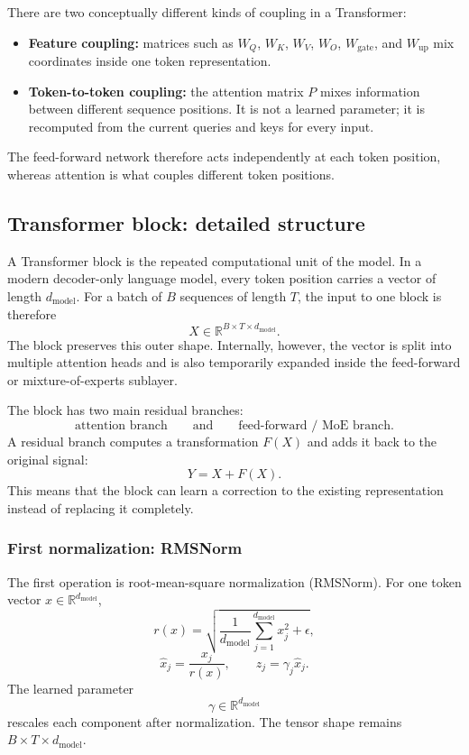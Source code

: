 \documentclass[11pt]{article}
\begin{document}
There are two conceptually different kinds of coupling in a Transformer:
\begin{itemize}[leftmargin=1.5em]
    \item \textbf{Feature coupling:} matrices such as $W_Q$, $W_K$, $W_V$,
    $W_O$, $W_{\mathrm{gate}}$, and $W_{\mathrm{up}}$ mix coordinates inside one
    token representation.
    \item \textbf{Token-to-token coupling:} the attention matrix $P$ mixes
    information between different sequence positions. It is not a learned
    parameter; it is recomputed from the current queries and keys for every input.
\end{itemize}
The feed-forward network therefore acts independently at each token position,
whereas attention is what couples different token positions.

\subsection{Transformer block: detailed structure}

A Transformer block is the repeated computational unit of the model.  In a
modern decoder-only language model, every token position carries a vector of
length $d_{\mathrm{model}}$.  For a batch of $B$ sequences of length $T$, the
input to one block is therefore
\[
X\in\mathbb{R}^{B\times T\times d_{\mathrm{model}}}.
\]
The block preserves this outer shape.  Internally, however, the vector is split
into multiple attention heads and is also temporarily expanded inside the
feed-forward or mixture-of-experts sublayer.

The block has two main residual branches:
\[
\boxed{\text{attention branch}}
\qquad\text{and}\qquad
\boxed{\text{feed-forward / MoE branch}}.
\]
A residual branch computes a transformation $F(X)$ and adds it back to the
original signal:
\[
Y=X+F(X).
\]
This means that the block can learn a correction to the existing representation
instead of replacing it completely.

\subsubsection{First normalization: RMSNorm}
The first operation is root-mean-square normalization (RMSNorm). For one token
vector $x\in\mathbb{R}^{d_{\mathrm{model}}}$,
\[
r(x)=\sqrt{\frac{1}{d_{\mathrm{model}}}\sum_{j=1}^{d_{\mathrm{model}}}x_j^2+\epsilon},
\]
\[
\widehat{x}_j=\frac{x_j}{r(x)},
\qquad
z_j=\gamma_j\widehat{x}_j.
\]
The learned parameter
\[
\gamma\in\mathbb{R}^{d_{\mathrm{model}}}
\]
rescales each component after normalization. The tensor shape remains
$B\times T\times d_{\mathrm{model}}$.
\end{document}
